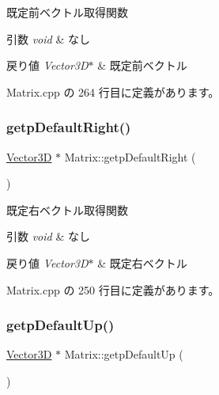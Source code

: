 既定前ベクトル取得関数 


\begin{DoxyParams}{引数}
{\em void} & なし \\
\hline
\end{DoxyParams}

\begin{DoxyRetVals}{戻り値}
{\em Vector3\+D$\ast$} & 既定前ベクトル \\
\hline
\end{DoxyRetVals}


 Matrix.\+cpp の 264 行目に定義があります。

\mbox{\label{class_matrix_a0096877aa292e1e8801deb912e1c8245}} 
\subsubsection{\texorpdfstring{getp\+Default\+Right()}{getpDefaultRight()}}
{\footnotesize\ttfamily \mbox{\hyperlink{class_vector3_d}{Vector3D}} $\ast$ Matrix\+::getp\+Default\+Right (\begin{DoxyParamCaption}{ }\end{DoxyParamCaption})}



既定右ベクトル取得関数 


\begin{DoxyParams}{引数}
{\em void} & なし \\
\hline
\end{DoxyParams}

\begin{DoxyRetVals}{戻り値}
{\em Vector3\+D$\ast$} & 既定右ベクトル \\
\hline
\end{DoxyRetVals}


 Matrix.\+cpp の 250 行目に定義があります。

\mbox{\label{class_matrix_a34bf031354bde8182be09f1b7805a320}} 
\subsubsection{\texorpdfstring{getp\+Default\+Up()}{getpDefaultUp()}}
{\footnotesize\ttfamily \mbox{\hyperlink{class_vector3_d}{Vector3D}} $\ast$ Matrix\+::getp\+Default\+Up (\begin{DoxyParamCaption}{ }\end{DoxyParamCaption})}




